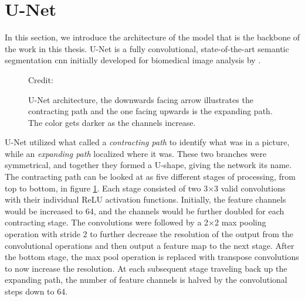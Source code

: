 \section{U-Net} \label{unet}

    In this section, we introduce the architecture of the model that is the backbone of the work in this thesis. U-Net is a fully convolutional, state-of-the-art\cite{rajak2021segmentation} semantic segmentation \gls{cnn} initially developed for biomedical image analysis by \citeauthor{unet_ronneberger2015}\cite{unet_ronneberger2015}. 
    
    \begin{figure}[H]
        \centering
        
        \caption[U-Net architecture]{U-Net architecture, the downwards facing arrow illustrates the contracting path and the one facing upwards is the expanding path. The color gets darker as the channels increase.}
      	\medskip 
        \label{unet_fig}
        \hspace*{15pt}\hbox{\scriptsize Credit: \citeauthor{unet_ronneberger2015}\cite{unet_ronneberger2015}}
    \end{figure}
    
    
    U-Net utilized what \citeauthor{unet_ronneberger2015}\cite{unet_ronneberger2015} called a \textit{contracting path} to identify what was in a picture, while an \textit{expanding path} localized where it was. These two branches were symmetrical, and together they formed a U-shape, giving the network its name. The contracting path can be looked at as five different stages of processing, from top to bottom, in figure \ref{unet_fig}. Each stage consisted of two 3×3 valid convolutions with their individual ReLU activation functions. Initially, the feature channels would be increased to 64, and the channels would be further doubled for each contracting stage. The convolutions were followed by a 2×2 max pooling operation with stride 2 to further decrease the resolution of the output from the convolutional operations and then output a feature map to the next stage. After the bottom stage, the max pool operation is replaced with transpose convolutions to now increase the resolution. At each subsequent stage traveling back up the expanding path, the number of feature channels is halved by the convolutional steps down to 64. 
    
